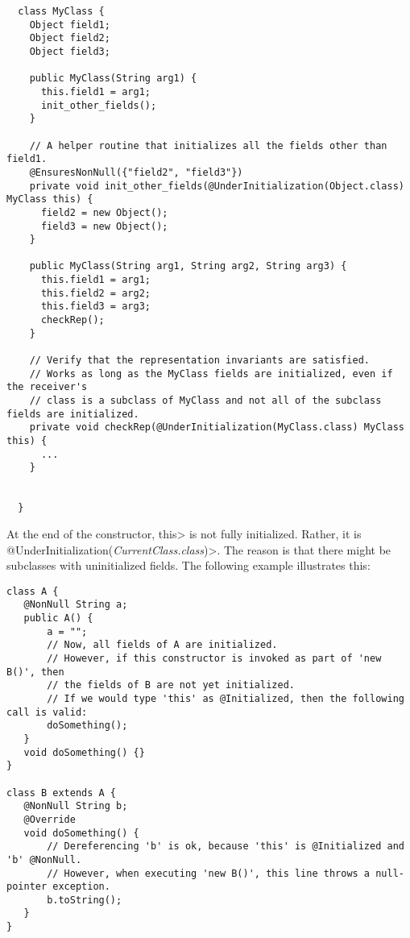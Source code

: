 \begin{Verbatim}
  class MyClass {
    Object field1;
    Object field2;
    Object field3;

    public MyClass(String arg1) {
      this.field1 = arg1;
      init_other_fields();
    }

    // A helper routine that initializes all the fields other than field1.
    @EnsuresNonNull({"field2", "field3"})
    private void init_other_fields(@UnderInitialization(Object.class) MyClass this) {
      field2 = new Object();
      field3 = new Object();
    }

    public MyClass(String arg1, String arg2, String arg3) {
      this.field1 = arg1;
      this.field2 = arg2;
      this.field3 = arg3;
      checkRep();
    }

    // Verify that the representation invariants are satisfied.
    // Works as long as the MyClass fields are initialized, even if the receiver's
    // class is a subclass of MyClass and not all of the subclass fields are initialized.
    private void checkRep(@UnderInitialization(MyClass.class) MyClass this) {
      ...
    }


  }
\end{Verbatim}


At the end of the constructor, \<this> is not fully initialized. Rather,
it is \<@UnderInitialization(\emph{CurrentClass.class})>.
The reason is that there might be subclasses with uninitialized fields.
The following example illustrates this:

\begin{Verbatim}
class A {
   @NonNull String a;
   public A() {
       a = "";
       // Now, all fields of A are initialized.
       // However, if this constructor is invoked as part of 'new B()', then
       // the fields of B are not yet initialized.
       // If we would type 'this' as @Initialized, then the following call is valid:
       doSomething();
   }
   void doSomething() {}
}

class B extends A {
   @NonNull String b;
   @Override
   void doSomething() {
       // Dereferencing 'b' is ok, because 'this' is @Initialized and 'b' @NonNull.
       // However, when executing 'new B()', this line throws a null-pointer exception.
       b.toString();
   }
}
\end{Verbatim}


